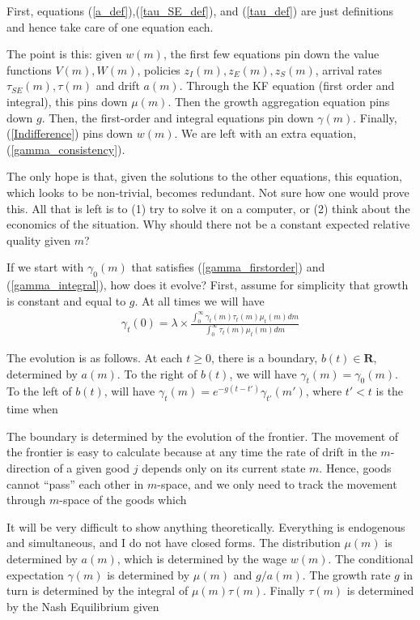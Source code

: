 \documentclass[12pt,english]{article}
\theoremstyle{remark}
\begin{document}
First, equations (\ref{a_def}),(\ref{tau_SE_def}), and (\ref{tau_def}) are just definitions and hence take care of one equation each. 

The point is this: given $w(m)$, the first few equations pin down the value functions $V(m),W(m)$, policies $z_I(m),z_E(m),z_S(m)$, arrival rates $\tau_{SE}(m),\tau(m)$ and drift $a(m)$. Through the KF equation (first order and integral), this pins down $\mu(m)$. Then the growth aggregation equation pins down $g$. Then, the first-order and integral equations pin down $\gamma(m)$. Finally, (\ref{Indifference}) pins down $w(m)$. We are left with an extra equation, (\ref{gamma_consistency}). 

The only hope is that, given the solutions to the other equations, this equation, which looks to be non-trivial, becomes redundant. Not sure how one would prove this. All that is left is to (1) try to solve it on a computer, or (2) think about the economics of the situation. Why should there not be a constant expected relative quality given $m$? 

If we start with $\gamma_0(m)$ that satisfies (\ref{gamma_firstorder}) and (\ref{gamma_integral}), how does it evolve? First, assume for simplicity that growth is constant and equal to $g$. At all times we will have 
\begin{align*}
	\gamma_t(0) = \lambda \times \frac{\int_{0}^{\infty} \gamma_t(m) \tau_t(m) \mu_t(m) dm}{\int_{0}^{\infty} \tau_t(m) \mu_t(m) dm}
\end{align*}

The evolution is as follows. At each $t \ge 0$, there is a boundary, $b(t) \in \mathbf{R}$, determined by $a(m)$. To the right of $b(t)$, we will have $\gamma_t(m) = \gamma_0(m)$. To the left of $b(t)$, will have $\gamma_t(m) = e^{-g(t-t')} \gamma_{t'} (m')$, where $t' < t$ is the time when 

The boundary is determined by the evolution of the frontier. The movement of the frontier is easy to calculate because at any time the rate of drift in the $m$-direction of a given good $j$ depends only on its current state $m$. Hence, goods cannot ``pass'' each other in $m$-space, and we only need to track the movement through $m$-space of the goods which 

It will be very difficult to show anything theoretically. Everything is endogenous and simultaneous, and I do not have closed forms. The distribution $\mu(m)$ is determined by $a(m)$, which is determined by the wage $w(m)$. The conditional expectation $\gamma(m)$ is determined by $\mu(m)$ and $g/a(m)$. The growth rate $g$ in turn is determined by the integral of $\mu(m)\tau(m)$. Finally $\tau(m)$ is determined by the Nash Equilibrium given 
\end{document}
